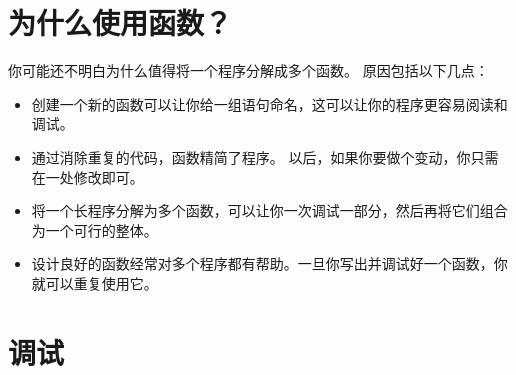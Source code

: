 \section{为什么使用函数？}



你可能还不明白为什么值得将一个程序分解成多个函数。 原因包括以下几点：

\begin{itemize}

\item 创建一个新的函数可以让你给一组语句命名，这可以让你的程序更容易阅读和调试。

\item 通过消除重复的代码，函数精简了程序。 以后，如果你要做个变动，你只需在一处修改即可。

\item 将一个长程序分解为多个函数，可以让你一次调试一部分，然后再将它们组合为一个可行的整体。

\item 设计良好的函数经常对多个程序都有帮助。一旦你写出并调试好一个函数，你就可以重复使用它。

\end{itemize}


%
\section{调试}
\index{debug]}  

